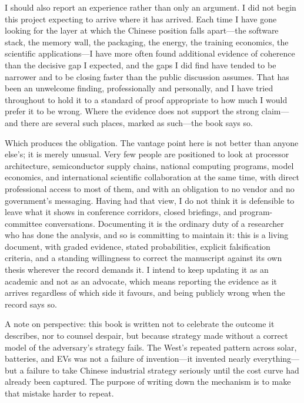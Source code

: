 \documentclass[11pt,a4paper,oneside]{book}
\begin{document}
I should also report an experience rather than only an argument. I did not begin this project expecting to arrive where it has arrived. Each time I have gone looking for the layer at which the Chinese position falls apart---the software stack, the memory wall, the packaging, the energy, the training economics, the scientific applications---I have more often found additional evidence of coherence than the decisive gap I expected, and the gaps I did find have tended to be narrower and to be closing faster than the public discussion assumes. That has been an unwelcome finding, professionally and personally, and I have tried throughout to hold it to a standard of proof appropriate to how much I would prefer it to be wrong. Where the evidence does not support the strong claim---and there are several such places, marked as such---the book says so.

Which produces the obligation. The vantage point here is not better than anyone else's; it is merely unusual. Very few people are positioned to look at processor architecture, semiconductor supply chains, national computing programs, model economics, and international scientific collaboration at the same time, with direct professional access to most of them, and with an obligation to no vendor and no government's messaging. Having had that view, I do not think it is defensible to leave what it shows in conference corridors, closed briefings, and program-committee conversations. Documenting it is the ordinary duty of a researcher who has done the analysis, and so is committing to maintain it: this is a living document, with graded evidence, stated probabilities, explicit falsification criteria, and a standing willingness to correct the manuscript against its own thesis wherever the record demands it. I intend to keep updating it as an academic and not as an advocate, which means reporting the evidence as it arrives regardless of which side it favours, and being publicly wrong when the record says so.

A note on perspective: this book is written not to celebrate the outcome it describes, nor to counsel despair, but because strategy made without a correct model of the adversary's strategy fails. The West's repeated pattern across solar, batteries, and EVs was not a failure of invention---it invented nearly everything---but a failure to take Chinese industrial strategy seriously until the cost curve had already been captured. The purpose of writing down the mechanism is to make that mistake harder to repeat.
\end{document}
